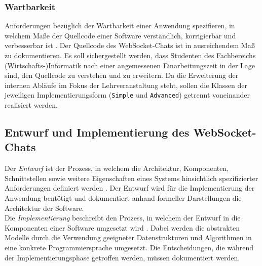 \documentclass[11pt,a4paper,titlepage]{scrartcl}
\numberwithin{equation}{section}
\begin{document}
\subsubsection*{Wartbarkeit}
Anforderungen bezüglich der Wartbarkeit einer Anwendung spezifieren, in welchem Maße der Quellcode einer Software verständlich, korrigierbar und verbesserbar ist \autocite[315]{mairiza_investigation_2010}. Der Quellcode des WebSocket-Chats ist in ausreichendem Maß zu dokumentieren. Es soll sichergestellt werden, dass Studenten des Fachbereichs (Wirtschafts-)Informatik nach einer angemessenen Einarbeitungszeit in der Lage sind, den Quellcode zu verstehen und zu erweitern. Da die Erweiterung der internen Abläufe im Fokus der Lehrveranstaltung steht, sollen die Klassen der jeweiligen Implementierungsform (\texttt{Simple} und \texttt{Advanced}) getrennt voneinander realisiert werden.
\subsection{Entwurf und Implementierung des WebSocket-Chats}
Der \textit{Entwurf} ist der Prozess, in welchem die Architektur, Komponenten, Schnittstellen sowie weitere Eigenschaften eines Systems hinsichtlich spezifizierter Anforderungen definiert werden \autocite[25]{insitute_of_electrical_and_electronics_engineers_ieee_1990}. Der Entwurf wird für die Implementierung der Anwendung bentötigt und dokumentiert anhand formeller Darstellungen die Architektur der Software. \\

\noindent Die \textit{Implementierung} beschreibt den Prozess, in welchem der Entwurf in die Komponenten einer Software umgesetzt wird \autocite[38]{insitute_of_electrical_and_electronics_engineers_ieee_1990}. Dabei werden die abstrakten Modelle durch die Verwendung geeigneter Datenstrukturen und Algorithmen in eine konkrete Programmiersprache umgesetzt. Die Entscheidungen, die während der Implementierungsphase getroffen werden, müssen dokumentiert werden.
\end{document}
